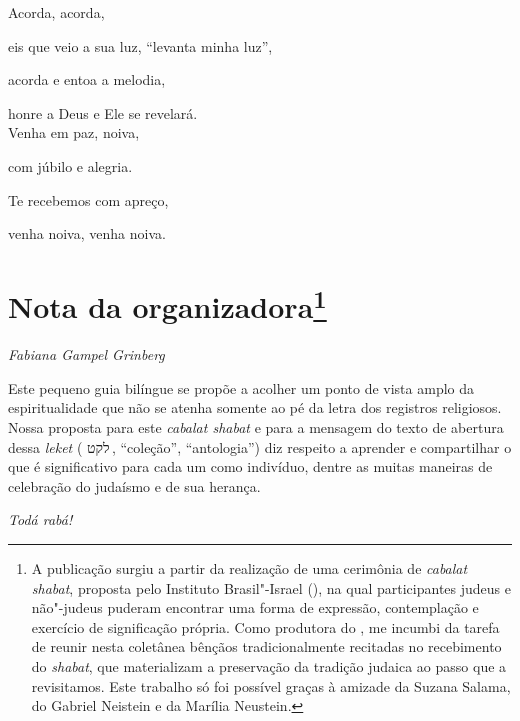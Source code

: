 Acorda, acorda,

eis que veio a sua luz, ``levanta minha luz'',

acorda e entoa a melodia,

honre a Deus e Ele se revelará.\\[10pt]

Venha em paz, noiva,

com júbilo e alegria.

Te recebemos com apreço,

venha noiva, venha noiva.




\chapter*{Nota da organizadora\footnote{ 
	A publicação surgiu a partir da realização de uma cerimônia de 
	\emph{cabalat shabat}, proposta pelo Instituto Brasil"-Israel (), na qual participantes judeus e não"-judeus puderam encontrar uma forma de expressão, contemplação e exercício de significação própria. Como produtora do , me incumbi da tarefa de reunir nesta coletânea bênçãos tradicionalmente recitadas no recebimento do \emph{shabat}, que materializam a preservação da tradição judaica ao passo que a revisitamos.
	Este trabalho só foi possível graças à amizade da Suzana Salama, do Gabriel Neistein e da Marília Neustein.} }


\begin{flushright}
\emph{Fabiana Gampel Grinberg}
\end{flushright}


Este pequeno guia bilíngue
 se propõe a acolher um ponto de vista amplo da espiritualidade que não se atenha somente ao pé da letra dos registros religiosos. Nossa proposta para este \emph{cabalat shabat} e  para a mensagem do texto de abertura dessa \emph{leket} ( {לקט}\,, ``coleção'', ``antologia'') diz respeito a aprender e compartilhar o que é significativo para cada um como indivíduo, dentre as muitas maneiras de celebração do judaísmo e de sua herança.%

\medskip
\emph{Todá rabá!}

